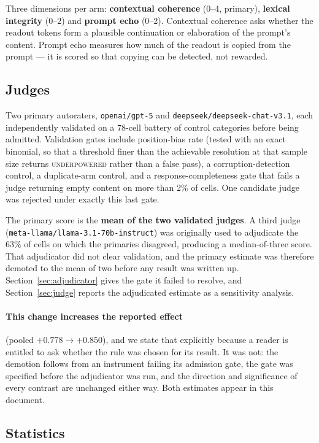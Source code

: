 \documentclass[11pt]{article}
\newcommand{\flag}[1]{\textcolor{flagged}{#1}}
\begin{document}
Three dimensions per arm: \textbf{contextual coherence} (0--4, primary),
\textbf{lexical integrity} (0--2) and \textbf{prompt echo} (0--2). Contextual
coherence asks whether the readout tokens form a plausible continuation or
elaboration of the prompt's content. Prompt echo measures how much of the
readout is copied from the prompt --- it is scored so that copying can be
detected, not rewarded.

\subsection{Judges}

Two primary autoraters, \texttt{openai/gpt-5} and
\texttt{deepseek/deepseek-chat-v3.1}, each independently validated on a 78-cell
battery of control categories before being admitted. Validation gates include
position-bias rate (tested with an exact binomial, so that a threshold finer
than the achievable resolution at that sample size returns
\textsc{underpowered} rather than a false pass), a corruption-detection control,
a duplicate-arm control, and a response-completeness gate that fails a judge
returning empty content on more than 2\% of cells. One candidate judge was
rejected under exactly this last gate.

The primary score is the \textbf{mean of the two validated judges}. A third
judge (\texttt{meta-llama/\allowbreak{}llama-3.1-70b-instruct}) was originally used to
adjudicate the 63\% of cells on which the primaries disagreed, producing a
median-of-three score. \flag{That adjudicator did not clear validation}, and the
primary estimate was therefore demoted to the mean of two before any result was
written up. Section~\ref{sec:adjudicator} gives the gate it failed to resolve,
and Section~\ref{sec:judge} reports the adjudicated estimate as a sensitivity
analysis.

\paragraph{This change increases the reported effect} (pooled $+0.778 \to
+0.850$), and we state that explicitly because a reader is entitled to ask
whether the rule was chosen for its result. It was not: the demotion follows
from an instrument failing its admission gate, the gate was specified before the
adjudicator was run, and the direction and significance of every contrast are
unchanged either way. Both estimates appear in this document.

\subsection{Statistics}
\end{document}
